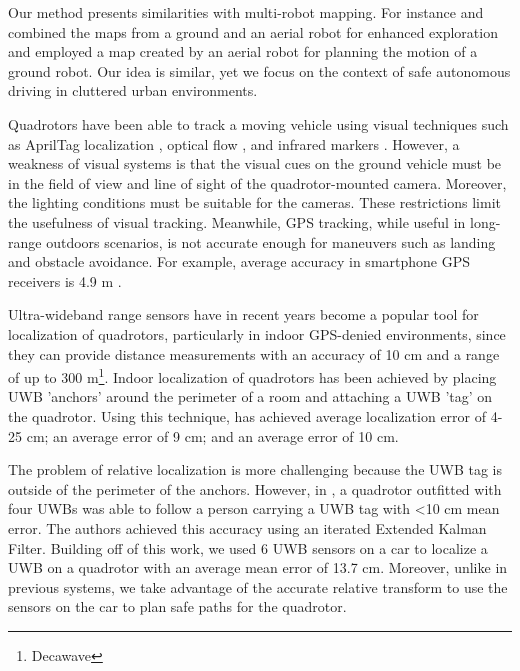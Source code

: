 

Our method presents similarities with multi-robot mapping. For instance \cite{Michael:2012gl} and \cite{Forster:2013kn} combined the maps from a ground and an aerial robot for enhanced exploration and \cite{Delmerico:2017vq} employed a map created by an aerial robot for planning the motion of a ground robot.
Our idea is similar, yet we focus on the context of safe autonomous driving in cluttered urban environments.

Quadrotors have been able to track a moving vehicle using visual techniques
such as AprilTag localization \cite{borowczyk2016autonomous}, optical flow \cite{herisse2012landing},
and infrared markers \cite{wenzel2011automatic}. However, a weakness of visual systems
is that the visual cues on the ground vehicle must be in the field of view and line
of sight of the quadrotor-mounted camera. Moreover, the lighting conditions must be suitable
for the cameras. These restrictions limit the usefulness of visual tracking. Meanwhile,
GPS tracking, while useful in long-range outdoors scenarios, is not accurate enough for 
maneuvers such as landing and obstacle avoidance. For example, average accuracy in
smartphone GPS receivers is 4.9 m \cite{gpsaccuracy}.

Ultra-wideband range sensors have in recent years become a popular tool for
localization of quadrotors, particularly in indoor GPS-denied environments, since they can
provide distance measurements with an accuracy of 10 cm and a range of
up to 300 m\footnote{Decawave}.
Indoor localization of quadrotors has been achieved by placing UWB 'anchors'
around the perimeter of a room and attaching a UWB 'tag' on the quadrotor.
Using this technique, \cite{mueller2015fusing} has achieved average localization error of 4-25 cm;
\cite{kempke2016harmonium} an average error of 9 cm; and \cite{benini2013imu}
an average error of 10 cm.

The problem of relative localization is more challenging because the UWB tag is outside of
the perimeter of the anchors. However, in \cite{tobiuwb}, a quadrotor
outfitted with four UWBs was able to follow a person carrying a UWB tag
with <10 cm mean error. The authors achieved this accuracy using an
iterated Extended Kalman Filter. Building off of this work, we used
6 UWB sensors on a car to localize a UWB on a quadrotor with an
average mean error of 13.7 cm. Moreover, unlike in previous systems,
we take advantage of the accurate relative transform to use the sensors
on the car to plan safe paths for the quadrotor.

